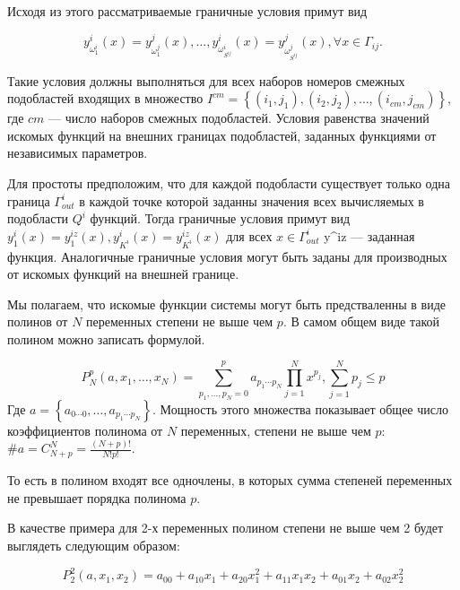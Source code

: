\documentclass[a4paper,12pt]{article}
\begin{document}
  Исходя из этого рассматриваемые граничные условия примут вид
  
  \begin{equation}
    y_{\omega_1^i}^i(x) = y_{\omega_1^j}^j(x),
    \ldots,
    y_{\omega_{S^{ij}}^i}^i(x) = y_{\omega_{S^{ij}}^j}^j(x), \forall x \in \Gamma_{ij}.
  \end{equation}

  Такие условия должны выполняться для всех наборов номеров смежных
  подобластей входящих в множество $I^{cm} =
  \left\{(i_1,j_1),(i_2,j_2),\ldots,(i_{cm},j_{cm}) \right\}$, где
  $cm$ --- число наборов смежных подобластей. Условия равенства
  значений искомых функций на внешних границах подобластей, заданных
  функциями от независимых параметров.

  Для простоты предположим, что для каждой подобласти существует
  только одна граница $\Gamma^{i}_{out}$ в каждой точке которой
  заданны значения всех вычисляемых в подобласти $Q^i$ функций. Тогда
  граничные условия примут вид $y_1^i(x) = y_1^{iz}(x),y_{K^i}^i(x) =
  y_{K^i}^{iz}(x)$ для всех $x \in \Gamma^{i}_{out}$ y^{iz} ---
  заданная функция. Аналогичные граничные условия могут быть заданы
  для производных от искомых функций на внешней границе.
  

  Мы полагаем, что искомые функции системы могут быть предстваленны в
  виде полинов от $N$ переменных степени не выше чем $p$.  В самом
  общем виде такой полином можно записать формулой.
  
  \begin{equation}
    P_N^p(a,x_1,\ldots,x_N)=
    \displaystyle\sum_{p_1,\ldots,p_N=0}^{p}a_{p_1 \cdots p_N}\prod_{j=1}^{N}x^{p_j},
    \displaystyle\sum_{j=1}^{N}p_j \le p
  \end{equation}
  Где $a = \left\{ a_{0 \cdots 0},\ldots,a_{p_1 \cdots p_N} \right\}$.
  Мощность этого множества показывает общее число
  коэффициентов полинома от $N$ переменных, степени не выше чем $p$:
  $ \#a = C_{N+p}^N = \frac{(N+p)!}{N!p!}$.
  
  То есть в полином входят все одночлены, в которых сумма степеней
  переменных не превышает порядка полинома $p$.

  В качестве примера для 2-х переменных полином степени не выше чем 2
  будет выглядеть следующим образом:

  \begin{equation*}
    P_2^2(a,x_1,x_2) = a_{00} + a_{10}x_1 + a_{20}x_1^2+ a_{11}x_1x_2 + a_{01}x_2 + a_{02}x_2^2
  \end{equation*}
\end{document}
